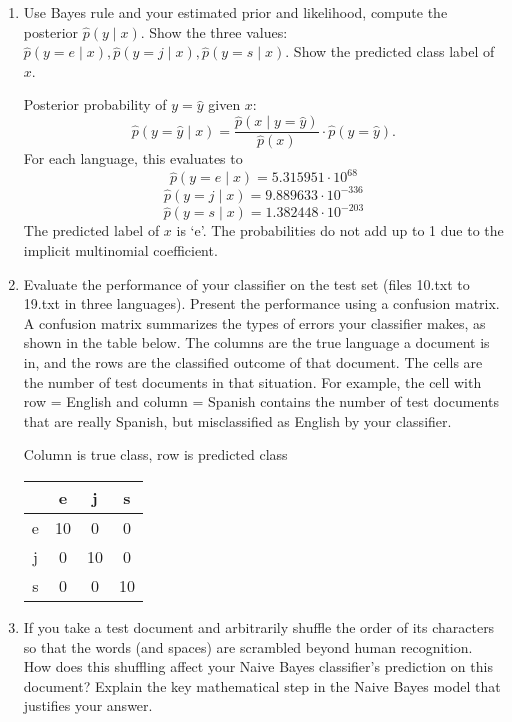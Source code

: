\documentclass[a4paper]{article}
\theoremstyle{definition}
\newenvironment{soln}{
    \leavevmode\color{blue}\ignorespaces
}{}
\begin{document}
\begin{enumerate}
\begin{soln}
\end{soln}

\item
Use Bayes rule and your estimated prior and likelihood, compute the posterior $\hat p(y \mid x)$.
Show the three values: $\hat p(y=e \mid x), \hat p(y=j \mid x), \hat p(y=s \mid x)$.
Show the predicted class label of $x$.

\begin{soln}
    Posterior probability of $y=\hat{y}$ given $x$:
    \[ \hat{p}(y=\hat{y}\mid x) = \frac{\hat{p}(x\mid y=\hat{y})}{\hat{p}(x)}\cdot \hat{p}(y=\hat{y}). \]
    For each language, this evaluates to 
    \[ \hat{p}(y=e\mid x) = 5.315951\cdot 10^{68} \]
    \[ \hat{p}(y=j\mid x) = 9.889633\cdot 10^{-336} \]
    \[ \hat{p}(y=s\mid x) = 1.382448\cdot 10^{-203}\]
    The predicted label of $x$ is `e'. The probabilities do not add up to 1 due to the implicit multinomial coefficient.
\end{soln}

\item
Evaluate the performance of your classifier on the test set (files 10.txt to 19.txt in three languages).
Present the performance using a confusion matrix. A confusion matrix summarizes the types of errors your classifier makes, as shown in the table below.   The columns are the true language a document is in, and the rows are the classified outcome of that document.  The cells are the number of test documents in that situation.  For example, the cell with row = English and column = Spanish contains the number of test documents that are really Spanish, but misclassified as English by your classifier.

\begin{soln}
    Column is true class, row is predicted class
    \begin{center}
       \begin{tabular}{c|ccc}
            & e & j & s\\\hline
           e & 10 & 0 & 0\\
           j & 0 & 10 & 0\\
           s & 0 & 0 & 10
       \end{tabular}
    \end{center}
\end{soln}

\item If you take a test document and arbitrarily shuffle the order of its characters so that the words (and spaces) are scrambled beyond human recognition.  How does this shuffling affect your Naive Bayes classifier's prediction on this document?  Explain the key mathematical step in the Naive Bayes model that justifies your answer.


\end{enumerate}
\end{document}
